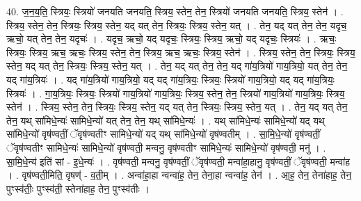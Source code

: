 \documentclass[17pt]{extarticle}
\begin{document}
40. ज॒न॒य॒ति॒ स्त्रियः॒ स्त्रियो॑ जनयति जनयति॒ स्त्रिय॒ स्तेन॒ तेन॒ स्त्रियो॑ जनयति जनयति॒ स्त्रिय॒ स्तेन॑ । . स्त्रिय॒ स्तेन॒ तेन॒ स्त्रियः॒ स्त्रिय॒ स्तेन॒ यद् यत् तेन॒ स्त्रियः॒ स्त्रिय॒ स्तेन॒ यत् । . तेन॒ यद् यत् तेन॒ तेन॒ यदृच॒ ऋचो॒ यत् तेन॒ तेन॒ यदृचः॑ । . यदृच॒ ऋचो॒ यद् यदृचः॒ स्त्रियः॒ स्त्रिय॒ ऋचो॒ यद् यदृचः॒ स्त्रियः॑ । . ऋचः॒ स्त्रियः॒ स्त्रिय॒ ऋच॒ ऋचः॒ स्त्रिय॒ स्तेन॒ तेन॒ स्त्रिय॒ ऋच॒ ऋचः॒ स्त्रिय॒ स्तेन॑ । . स्त्रिय॒ स्तेन॒ तेन॒ स्त्रियः॒ स्त्रिय॒ स्तेन॒ यद् यत् तेन॒ स्त्रियः॒ स्त्रिय॒ स्तेन॒ यत् । . तेन॒ यद् यत् तेन॒ तेन॒ यद् गा॑य॒त्रियो॑ गाय॒त्रियो॒ यत् तेन॒ तेन॒ यद् गा॑य॒त्रियः॑ । . यद् गा॑य॒त्रियो॑ गाय॒त्रियो॒ यद् यद् गा॑य॒त्रियः॒ स्त्रियः॒ स्त्रियो॑ गाय॒त्रियो॒ यद् यद् गा॑य॒त्रियः॒ स्त्रियः॑ । . गा॒य॒त्रियः॒ स्त्रियः॒ स्त्रियो॑ गाय॒त्रियो॑ गाय॒त्रियः॒ स्त्रिय॒ स्तेन॒ तेन॒ स्त्रियो॑ गाय॒त्रियो॑ गाय॒त्रियः॒ स्त्रिय॒ स्तेन॑ । . स्त्रिय॒ स्तेन॒ तेन॒ स्त्रियः॒ स्त्रिय॒ स्तेन॒ यद् यत् तेन॒ स्त्रियः॒ स्त्रिय॒ स्तेन॒ यत् । . तेन॒ यद् यत् तेन॒ तेन॒ यथ् सा॑मिधे॒न्यः॑ सामिधे॒न्यो॑ यत् तेन॒ तेन॒ यथ् सा॑मिधे॒न्यः॑ । . यथ् सा॑मिधे॒न्यः॑ सामिधे॒न्यो॑ यद् यथ् सा॑मिधे॒न्यो॑ वृष॑ण्वतीं॒ ॅवृष॑ण्वतीꣳ सामिधे॒न्यो॑ यद् यथ् सा॑मिधे॒न्यो॑ वृष॑ण्वतीम् । . सा॒मि॒धे॒न्यो॑ वृष॑ण्वतीं॒ ॅवृष॑ण्वतीꣳ सामिधे॒न्यः॑ सामिधे॒न्यो॑ वृष॑ण्वती॒ मन्वनु॒ वृष॑ण्वतीꣳ सामिधे॒न्यः॑ सामिधे॒न्यो॑ वृष॑ण्वती॒ मनु॑ । . सा॒मि॒धे॒न्य॑ इति॑ सां - इ॒धे॒न्यः॑ । . वृष॑ण्वती॒ मन्वनु॒ वृष॑ण्वतीं॒ ॅवृष॑ण्वती॒ मन्वा॑हा॒हानु॒ वृष॑ण्वतीं॒ ॅवृष॑ण्वती॒ मन्वा॑ह । . वृष॑ण्वती॒मिति॒ वृषण्॑ - व॒ती॒म् । . अन्वा॑हा॒हा न्वन्वा॑ह॒ तेन॒ तेना॒हा न्वन्वा॑ह॒ तेन॑ । . आ॒ह॒ तेन॒ तेना॑हाह॒ तेन॒ पुꣳस्व॑तीः॒ पुꣳस्व॑ती॒ स्तेना॑हाह॒ तेन॒ पुꣳस्व॑तीः । \newline
\pagebreak
{}
\end{document}
